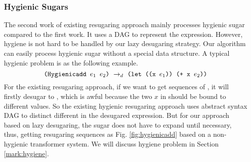 \subsubsection{Hygienic Sugars}
\label{mark:hygienic}


The second work \cite{hygienic} of existing resugaring approach mainly processes hygienic sugar compared to the first work. It uses a DAG to represent the expression. However, hygiene is not hard to be handled by our lazy desugaring strategy. Our algorithm can easily process hygienic sugar without a special data structure.
A typical hygienic problem is as the following example.
\[
\texttt{(Hygienicadd $e_1$ $e_2$)} ~\rightarrow_d~ \texttt{(let ((x $e_1$)) (+ x $e_2$))}
\]
For the existing resugaring approach, if we want to get sequences of , it will firstly desugar to , which is awful because the two $x$ in  should be bound to different values. So the existing hygienic resugaring approach uses abstract syntax DAG to distinct different  in the desugared expression. But for our approach based on lazy desugaring, the  sugar does not have to expand until necessary, thus, getting resugaring sequences as Fig.  \ref{fig:hygienicadd} based on a non-hygienic transformer system. We will discuss hygiene problem in Section \ref{mark:hygiene}.



